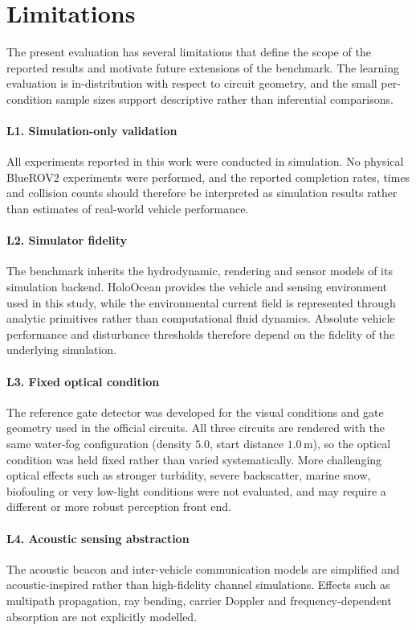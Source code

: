 \section{Limitations}
\label{sec:limitations}

The present evaluation has several limitations that define the scope of the
reported results and motivate future extensions of the benchmark. The learning
evaluation is in-distribution with respect to circuit geometry, and the small
per-condition sample sizes support descriptive rather than inferential
comparisons.

\paragraph{L1. Simulation-only validation}
All experiments reported in this work were conducted in simulation. No physical
BlueROV2 experiments were performed, and the reported completion rates, times and
collision counts should therefore be interpreted as simulation results rather
than estimates of real-world vehicle performance.

\paragraph{L2. Simulator fidelity}
The benchmark inherits the hydrodynamic, rendering and sensor models of its
simulation backend. HoloOcean provides the vehicle and sensing environment used
in this study, while the environmental current field is represented through
analytic primitives rather than computational fluid dynamics. Absolute vehicle
performance and disturbance thresholds therefore depend on the fidelity of the
underlying simulation.

\paragraph{L3. Fixed optical condition}
The reference gate detector was developed for the visual conditions and gate
geometry used in the official circuits. All three circuits are rendered with the
same water-fog configuration (density $5.0$, start distance $1.0$\,m), so the
optical condition was held fixed rather than varied systematically. More
challenging optical effects such as stronger turbidity, severe backscatter,
marine snow, biofouling or very low-light conditions were not evaluated, and may
require a different or more robust perception front end.

\paragraph{L4. Acoustic sensing abstraction}
The acoustic beacon and inter-vehicle communication models are simplified and
acoustic-inspired rather than high-fidelity channel simulations. Effects such as
multipath propagation, ray bending, carrier Doppler and frequency-dependent
absorption are not explicitly modelled.

